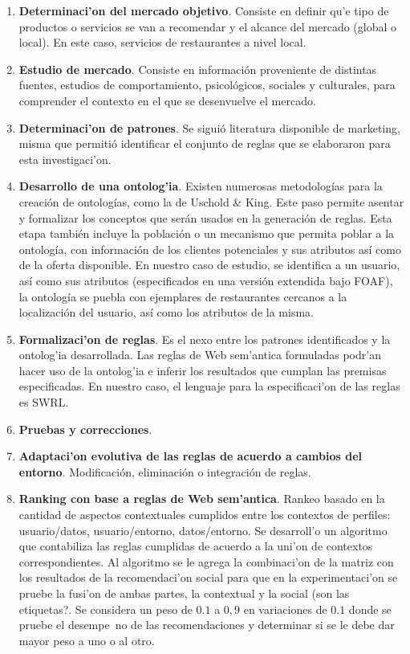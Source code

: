 \documentclass[11pt]{article}
\begin{document}
\begin{enumerate}
\item \textbf{Determinaci'on del mercado objetivo}. Consiste en definir qu'e tipo de productos o servicios se van a recomendar y el alcance del mercado (global o local). En este caso, servicios de restaurantes a nivel local.
\item \textbf{Estudio de mercado}. Consiste en información proveniente de distintas fuentes, estudios de comportamiento, psicológicos, sociales y culturales, para comprender el contexto en el que se desenvuelve el mercado.
\item \textbf{Determinaci'on de patrones}. Se siguió literatura disponible de marketing, misma que permitió identificar el conjunto de reglas que se elaboraron para esta investigaci'on.
\item \textbf{Desarrollo de una ontolog'ia}. Existen numerosas metodologías para la creación de ontologías, como la de Uschold \& King. Este paso permite asentar y formalizar los conceptos que serán usados en la generación de reglas. Esta etapa también incluye la población o un mecanismo que permita poblar a la ontología, con
información de los clientes potenciales y sus atributos así como de la oferta disponible. En nuestro caso de estudio, se identifica a un usuario, así como sus atributos (especificados en una versión extendida bajo FOAF), la ontología
se puebla con ejemplares de restaurantes cercanos a la localización del usuario, así como los atributos de la misma.

\item \textbf{Formalizaci'on de reglas}. Es el nexo entre los patrones identificados y la ontolog'ia desarrollada. Las reglas de Web sem'antica formuladas podr'an hacer uso de la ontolog'ia e inferir los resultados que cumplan las premisas especificadas. En nuestro caso, el lenguaje para la especificaci'on de las reglas es SWRL.
\item \textbf{Pruebas y correcciones}.
\item \textbf{Adaptaci'on evolutiva de las reglas de acuerdo a cambios del entorno}. Modificación, eliminación o integración de reglas.
\item \textbf{Ranking con base a reglas de Web sem'antica}. Rankeo basado en la cantidad de aspectos contextuales cumplidos entre los contextos de perfiles: usuario/datos, usuario/entorno, datos/entorno. Se desarroll'o un algoritmo que contabiliza las reglas cumplidas de acuerdo a la uni'on de contextos correspondientes. Al algoritmo se le agrega la combinaci'on de la matriz con los resultados de la recomendaci'on social para que en la experimentaci'on se pruebe la fusi'on de ambas partes, la contextual y la social (son las etiquetas?. Se considera un peso de $0.1$ a $0,9$ en variaciones de $0.1$ donde se pruebe el desempe~no de las recomendaciones y determinar si se le debe dar mayor peso a uno o al otro.
\end{enumerate}
\end{document}
